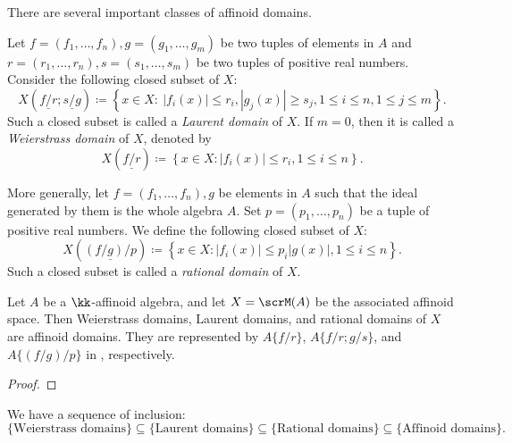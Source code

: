 
    There are several important classes of affinoid domains.

    \begin{construction}\label{constr:weierstrass_Laurent_rational_domains}
        Let \(f=(f_1,\ldots,f_n),g = (g_1,\ldots,g_m)\) be two tuples of elements in \(A\) and \(r=(r_1,\ldots,r_n),s=(s_1,\ldots,s_m)\) be two tuples of positive real numbers.
        Consider the following closed subset of \(X\):
        \[ X\left(\underline{f/r};\underline{s/g}\right) \coloneqq \left\{ x \in X \colon\ |f_i(x)| \le r_i, |g_j(x)| \ge s_j, 1 \le i \le n, 1 \le j \le m \right\}. \]
        Such a closed subset is called a \emph{Laurent domain} of \(X\).
        If \(m=0\), then it is called a \emph{Weierstrass domain} of \(X\), denoted by 
        \[ X\left(\underline{f/r}\right) \coloneqq \left\{ x \in X \colon |f_i(x)| \le r_i, 1 \le i \le n \right\}. \]

        More generally, let \(f=(f_1,\ldots,f_n),g\) be elements in \(A\) such that the ideal generated by them is the whole algebra \(A\).
        Set \(p=(p_1,\ldots,p_n)\) be a tuple of positive real numbers.
        We define the following closed subset of \(X\):
        \[ X\left(\underline{(f/g)/p}\right) \coloneqq \left\{ x \in X \colon |f_i(x)| \le p_i |g(x)|, 1 \le i \le n \right\}. \]
        Such a closed subset is called a \emph{rational domain} of \(X\).
    \end{construction}  

    \begin{proposition}\label{prop:weierstrass_Laurent_rational_domains_are_affinoid_domains}
        Let \(A\) be a \(\kk\)-affinoid algebra, and let \(X = \scrM(A)\) be the associated affinoid space.
        Then Weierstrass domains, Laurent domains, and rational domains of \(X\) are affinoid domains.
        They are represented by \(A\{f/r\}\), \(A\{f/r;g/s\}\), and \(A\{(f/g)/p\}\) in , respectively.
    \end{proposition}
    \begin{proof}
    \end{proof}

    We have a sequence of inclusion:
    \[ \{\text{Weierstrass domains}\} \subseteq \{\text{Laurent domains}\} \subseteq \{\text{Rational domains}\} \subseteq \{\text{Affinoid domains}\}. \]

